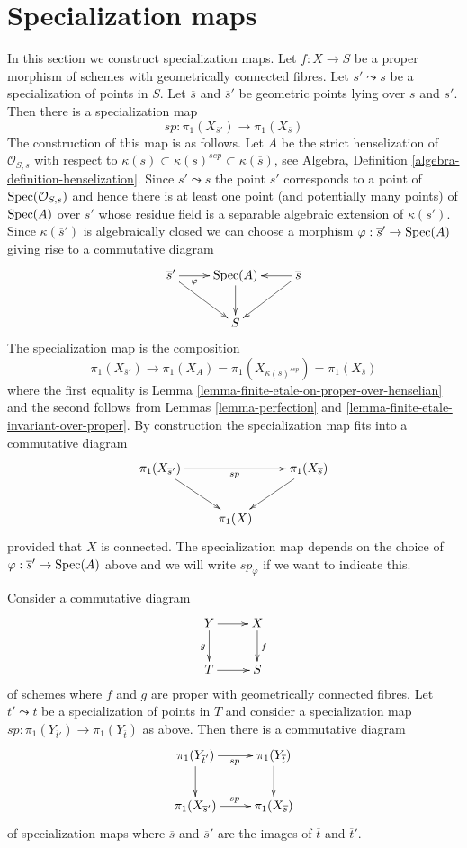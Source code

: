 \section{Specialization maps}
\label{section-specialization-map}

\noindent
In this section we construct specialization maps.
Let $f : X \to S$ be a proper morphism of schemes
with geometrically connected fibres.
Let $s' \leadsto s$ be a specialization of points in $S$.
Let $\overline{s}$ and $\overline{s}'$ be geometric points
lying over $s$ and $s'$. Then there is a specialization map
$$
sp : \pi_1(X_{\overline{s}'}) \longrightarrow \pi_1(X_{\overline{s}})
$$
The construction of this map is as follows. Let $A$ be the
strict henselization of $\mathcal{O}_{S, s}$ with respect to
$\kappa(s) \subset \kappa(s)^{sep} \subset \kappa(\overline{s})$, see
Algebra, Definition \ref{algebra-definition-henselization}.
Since $s' \leadsto s$ the point $s'$ corresponds to a point of
$\mathop{\mathrm{Spec}}(\mathcal{O}_{S, s})$ and hence there is at least one point
(and potentially many points)
of $\mathop{\mathrm{Spec}}(A)$ over $s'$ whose residue field is a separable algebraic
extension of $\kappa(s')$.
Since $\kappa(\overline{s}')$ is algebraically closed we can choose
a morphism $\varphi : \overline{s}' \to \mathop{\mathrm{Spec}}(A)$ giving rise to a commutative
diagram
$$
\xymatrix{
\overline{s}' \ar[r]_-\varphi \ar[rd] &
\Spec(A) \ar[d] &
\overline{s} \ar[l] \ar[ld] \\
& S
}
$$
The specialization map is the composition
$$
\pi_1(X_{\overline{s}'}) \longrightarrow
\pi_1(X_A) =
\pi_1(X_{\kappa(s)^{sep}}) =
\pi_1(X_{\overline{s}})
$$
where the first equality is
Lemma \ref{lemma-finite-etale-on-proper-over-henselian}
and the second follows from
Lemmas \ref{lemma-perfection} and
\ref{lemma-finite-etale-invariant-over-proper}.
By construction the specialization map fits into a commutative
diagram
$$
\xymatrix{
\pi_1(X_{\overline{s}'}) \ar[rr]_{sp} \ar[rd] & &
\pi_1(X_{\overline{s}}) \ar[ld] \\
& \pi_1(X)
}
$$
provided that $X$ is connected. The specialization map depends on the
choice of $\varphi : \overline{s}' \to \mathop{\mathrm{Spec}}(A)$ above and we will
write $sp_\varphi$ if we want to indicate this.

\begin{lemma}
\label{lemma-specialization-map-base-change}
Consider a commutative diagram
$$
\xymatrix{
Y \ar[d]_g \ar[r] & X \ar[d]^f \\
T \ar[r] & S
}
$$
of schemes where $f$ and $g$ are proper with geometrically connected
fibres. Let $t' \leadsto t$ be a specialization of points in $T$
and consider a specialization map
$sp : \pi_1(Y_{\overline{t}'}) \to \pi_1(Y_{\overline{t}})$ as above.
Then there is a commutative diagram
$$
\xymatrix{
\pi_1(Y_{\overline{t}'}) \ar[r]_{sp} \ar[d] & \pi_1(Y_{\overline{t}}) \ar[d] \\
\pi_1(X_{\overline{s}'}) \ar[r]^{sp} & \pi_1(X_{\overline{s}})
}
$$
of specialization maps where $\overline{s}$ and $\overline{s}'$
are the images of $\overline{t}$ and $\overline{t}'$.
\end{lemma}

